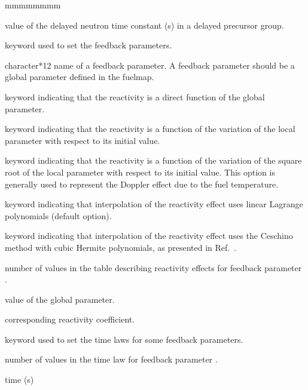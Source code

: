 \begin{ListeDeDescription}{mmmmmmmm}
\item[\dusa{lambdai}] value of the delayed neutron time constant (s) in a delayed precursor group.

\item[\moc{ALPHA}] keyword used to set the feedback parameters.

\item[\moc{PNAME}] character*12 name of a feedback parameter. A feedback parameter should be a global parameter defined in the fuelmap.

\item[\moc{DIRECT}] keyword indicating that the reactivity is a direct function of the global parameter.

\item[\moc{DERIV}] keyword indicating that the reactivity is a function of the variation of the local parameter with respect to its initial value.

\item[\moc{SQDERIV}] keyword indicating that the reactivity is a function of the variation of the square root of the local parameter with respect to its initial value.
This option is generally used to represent the Doppler effect due to the fuel temperature.

\item[\moc{LINEAR}] keyword indicating that interpolation of the reactivity effect uses linear Lagrange polynomials (default option).

\item[\moc{CUBIC}] keyword indicating that interpolation of the reactivity effect uses the Ceschino method
with cubic Hermite polynomials, as presented in Ref.~.

\item[\dusa{nalpha}] number of values in the table describing reactivity effects for feedback parameter .

\item[\dusa{x}] value of the global parameter.

\item[\dusa{y}] corresponding reactivity coefficient.

\item[\moc{PTIME}] keyword used to set the time laws for some feedback parameters.

\item[\dusa{ntime}] number of values in the time law for feedback parameter .

\item[\dusa{t}] time (s)


\end{ListeDeDescription}
